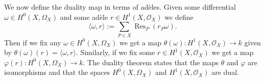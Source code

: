 \documentclass[draft, 11pt]{article} %
\theoremstyle{plain}
\theoremstyle{remark}
\newcommand{\hzero}{{H^0(X,\Omega_X)}}
\newcommand{\hone}{H^1(X,\mathcal{O}_X)}
\DeclareMathOperator{\res}{Res}
\begin{document}
We now define the duality map in terms of ad\`eles.
Given some differential $\omega \in \hzero$ and some ad\`ele $r \in \hone$ we define 
\[
\langle \omega, r \rangle := \sum_{P\in X} \res_{P}( r_P\omega).
\]
Then if we fix any $\omega \in \hzero$ we get a map $\theta(\omega):\hone \rightarrow k$ given by $\theta(\omega)(r) = \langle \omega, r \rangle$.
Similarly, if we fix some $r \in \hone$ we get a map $\varphi(r):\hzero \rightarrow k$.
The duality theorem \cite[Thm. 2, Chap. II]{algebraicgroupsandclassfields} states that the maps $\theta$ and $\varphi$ are isomorphisms and that the spaces $\hzero$ and $\hone$ are dual.

\end{document}
